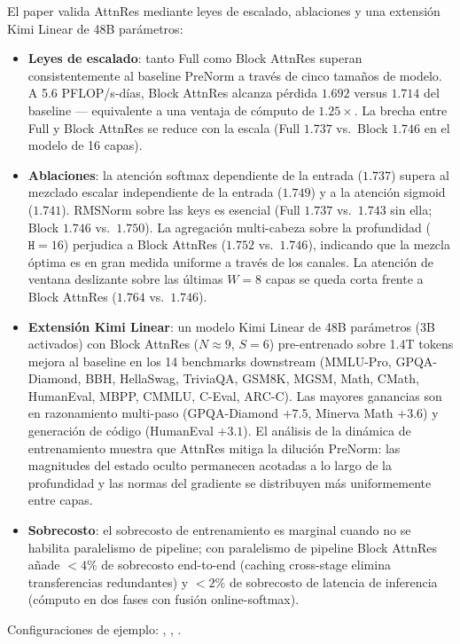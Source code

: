 El paper \citep{sun_attnres_2026} valida AttnRes mediante leyes de
escalado, ablaciones y una extensión Kimi Linear de 48B parámetros:
\begin{itemize}[leftmargin=*]
    \item \textbf{Leyes de escalado}: tanto Full como Block AttnRes
        superan consistentemente al baseline PreNorm a través de cinco
        tamaños de modelo. A 5.6 PFLOP/s-días, Block AttnRes alcanza
        pérdida $1.692$ versus $1.714$ del baseline --- equivalente a
        una ventaja de cómputo de $1.25 \times$. La brecha entre Full y
        Block AttnRes se reduce con la escala (Full $1.737$ vs.\ Block
        $1.746$ en el modelo de 16 capas).
    \item \textbf{Ablaciones}: la atención softmax dependiente de la
        entrada ($1.737$) supera al mezclado escalar independiente de
        la entrada ($1.749$) y a la atención sigmoid ($1.741$). RMSNorm
        sobre las keys es esencial (Full $1.737$ vs.\ $1.743$ sin
        ella; Block $1.746$ vs.\ $1.750$). La agregación multi-cabeza
        sobre la profundidad ($\texttt{H} = 16$) perjudica a Block
        AttnRes ($1.752$ vs.\ $1.746$), indicando que la mezcla
        óptima es en gran medida uniforme a través de los canales. La
        atención de ventana deslizante sobre las últimas $W = 8$ capas
        se queda corta frente a Block AttnRes ($1.764$ vs.\ $1.746$).
    \item \textbf{Extensión Kimi Linear}: un modelo Kimi Linear de
        48B parámetros (3B activados) con Block AttnRes ($N \approx 9$,
        $S = 6$) pre-entrenado sobre 1.4T tokens mejora al baseline en
        los 14 benchmarks downstream (MMLU-Pro, GPQA-Diamond, BBH,
        HellaSwag, TriviaQA, GSM8K, MGSM, Math, CMath, HumanEval,
        MBPP, CMMLU, C-Eval, ARC-C). Las mayores ganancias son en
        razonamiento multi-paso (GPQA-Diamond $+7.5$, Minerva Math
        $+3.6$) y generación de código (HumanEval $+3.1$). El análisis
        de la dinámica de entrenamiento muestra que AttnRes mitiga la
        dilución PreNorm: las magnitudes del estado oculto permanecen
        acotadas a lo largo de la profundidad y las normas del
        gradiente se distribuyen más uniformemente entre capas.
    \item \textbf{Sobrecosto}: el sobrecosto de entrenamiento es
        marginal cuando no se habilita paralelismo de pipeline; con
        paralelismo de pipeline Block AttnRes añade $<4\%$ de
        sobrecosto end-to-end (caching cross-stage elimina
        transferencias redundantes) y $<2\%$ de sobrecosto de latencia
        de inferencia (cómputo en dos fases con fusión online-softmax).
\end{itemize}

Configuraciones de ejemplo: ,
,
.
